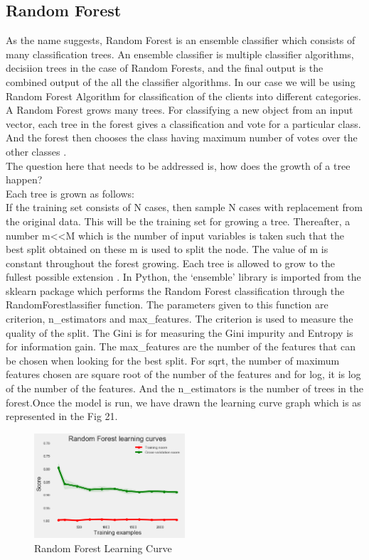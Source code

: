 \subsection{Random Forest} 
As the name suggests, Random Forest is an ensemble classifier which consists of many classification trees. An ensemble classifier is multiple classifier algorithms, decisiion trees in the case of Random Forests, and the final output is the combined output of the all the classifier algorithms. In our case we will be using Random Forest Algorithm for classification of the clients into different categories. A Random Forest grows many trees. For classifying a new object from an input vector, each tree in the forest gives a classification and vote for a particular class. And the forest then chooses the class having maximum number of votes over the other classes \cite{link13}.\\
The question here that needs to be addressed is, how does the growth of a tree happen?\\
Each tree is grown as follows:\\
If the training set consists of N cases, then sample N cases with replacement from the original data. This will be the training set for growing a tree. Thereafter, a number m<<M which is the number of input variables is taken such that the best split obtained on these m is used to split the node. The value of m is constant throughout the forest growing. Each tree is allowed to grow to the fullest possible extension \cite{link13}.
In Python, the `ensemble' library is imported from the sklearn package which performs the Random Forest classification through the RandomForestlassifier function. The parameters given to this function are criterion, n\_estimators and max\_features. The criterion is used to measure the quality of the split. The Gini is for measuring the Gini impurity and Entropy is for information gain. The max\_features are the number of the features that can be chosen when looking for the best split. For sqrt, the number of maximum features chosen are square root of the number of the features and for log, it is log of the number of the features. And the n\_estimators is the number of trees in the forest.Once the model is run, we have drawn the learning curve graph which is as represented in the Fig 21.

\begin{figure}[h]
\caption{Random Forest Learning Curve}
\label{5.3}
\centering
\includegraphics[width=0.5\textwidth]{images/5_3.png}
\end{figure}

